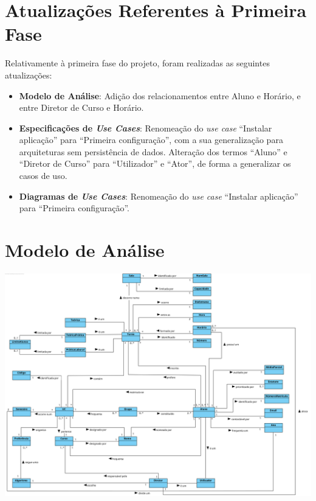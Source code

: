 \documentclass[a4paper,12pt]{scrreprt}
\begin{document}
\chapter{Atualizações Referentes à Primeira Fase}
\vspace{1cm}

Relativamente à primeira fase do projeto, foram realizadas as seguintes atualizações:

\begin{itemize}
    \item \textbf{Modelo de Análise}: Adição dos relacionamentos entre Aluno e Horário, e
        entre Diretor de Curso e Horário.
    \item \textbf{Especificações de \textit{Use Cases}}: Renomeação do \textit{use case}
        “Instalar aplicação” para “Primeira configuração”, com a sua generalização para
        arquiteturas sem persistência de dados. Alteração dos termos “Aluno” e “Diretor de Curso”
        para “Utilizador” e “Ator”, de forma a generalizar os casos de uso.
    \item \textbf{Diagramas de \textit{Use Cases}}: Renomeação do \textit{use case}
        “Instalar aplicação” para “Primeira configuração”.
\end{itemize}




\chapter{Modelo de Análise}
\vspace{2cm}

\begin{minipage}{\textwidth}
    \centering
    \includegraphics[width=1\textwidth]{images/modelo-analise.png}
    \label{fig:modelo_analise}
\end{minipage}
\end{document}
